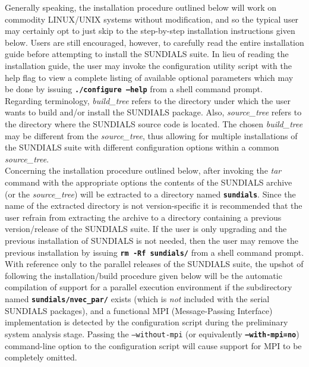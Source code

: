 Generally speaking, the installation procedure outlined below will work on commodity \small LINUX\normalsize/\small UNIX \normalsize systems without modification, and so the typical user may certainly opt to just skip to the step-by-step installation instructions given below.  Users are still encouraged, however, to carefully read the entire installation guide before attempting to install the \small SUNDIALS \normalsize suite.  In lieu of reading the installation guide, the user may invoke the configuration utility script with the help flag to view a complete listing of available optional parameters which may be done by issuing \texttt{\textbf{./configure --help}} from a shell command prompt.
\\

Regarding terminology, \textit{build\_tree} refers to the directory under which the user wants to build and/or install the \small SUNDIALS \normalsize package.  Also, \textit{source\_tree} refers to the directory where the \small SUNDIALS \normalsize source code is located.  The chosen \textit{build\_tree} may be different from the \textit{source\_tree}, thus allowing for multiple installations of the \small SUNDIALS \normalsize suite with different configuration options within a common \textit{source\_tree}.
\\

Concerning the installation procedure outlined below, after invoking the \textit{tar} command with the appropriate options the contents of the \small SUNDIALS \normalsize archive (or the \textit{source\_tree}) will be extracted to a directory named \texttt{\textbf{sundials}}.  Since the name of the extracted directory is not version-specific it is recommended that the user refrain from extracting the archive to a directory containing a previous version/release of the \small SUNDIALS \normalsize suite.  If the user is only upgrading and the previous installation of \small SUNDIALS \normalsize is not needed, then the user may remove the previous installation by issuing \texttt{\textbf{rm -Rf}}\texttt{\textbf{ sundials/}} from a shell command prompt.
\\

With reference only to the parallel releases of the \small SUNDIALS \normalsize suite, the upshot of following the installation/build procedure given below will be the automatic compilation of support for a parallel execution environment if the subdirectory named \texttt{\textbf{sundials/nvec\_\hspace{0.2ex}par/}} exists (which is \textit{not} included with the serial \small SUNDIALS \normalsize packages), and a functional \small MPI \normalsize (\small M\normalsize essage-\small P\normalsize assing \small I\normalsize nterface) implementation is detected by the configuration script during the preliminary system analysis stage.  Passing the \texttt{--without-mpi} (or equivalently \texttt{\textbf{--with-mpi=no}}) command-line option to the configuration script will cause support for \small MPI \normalsize to be completely omitted.
\\

